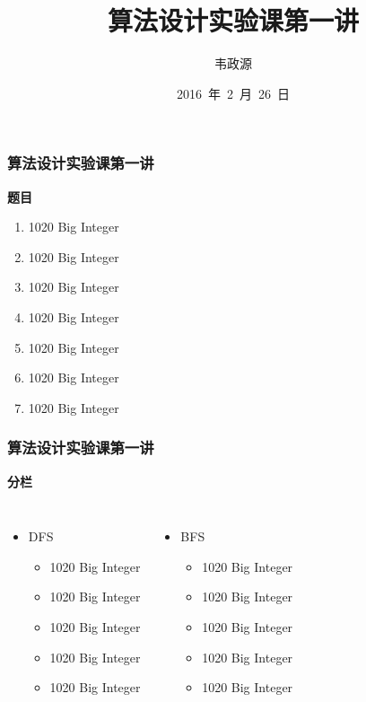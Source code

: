 \documentclass[mathserif,notheorems]{beamer}
\begin{document}
\title[算法设计]{算法设计实验课第一讲}
\author[Wsine]{韦政源}
\date[February, 2016]{2016~年~2~月~26~日}
\frame{\titlepage}

\begin{frame}
\frametitle{算法设计实验课第一讲}
\linespread{1.2}   %
\centerline{\bfseries\large\color{violet}题目}
\begin{enumerate}
\item 1020 Big Integer
\item 1020 Big Integer
\item 1020 Big Integer
\item 1020 Big Integer
\item 1020 Big Integer
\item 1020 Big Integer
\item 1020 Big Integer
\end{enumerate}
\end{frame}

\begin{frame} 
\linespread{1.2}
\frametitle{算法设计实验课第一讲}
\centerline{\bfseries\large\color{violet}分栏}
\begin{columns}
\begin{itemize}
\item DFS
	\begin{itemize}
	\item 1020 Big Integer
	\item 1020 Big Integer
	\item 1020 Big Integer
	\item 1020 Big Integer
	\item 1020 Big Integer
	\end{itemize}
\end{itemize}
\begin{itemize}
\item BFS
	\begin{itemize}
	\item 1020 Big Integer
	\item 1020 Big Integer
	\item 1020 Big Integer
	\item 1020 Big Integer
	\item 1020 Big Integer
	\end{itemize}
\end{itemize}
\end{columns}
\end{frame}
\end{document}
